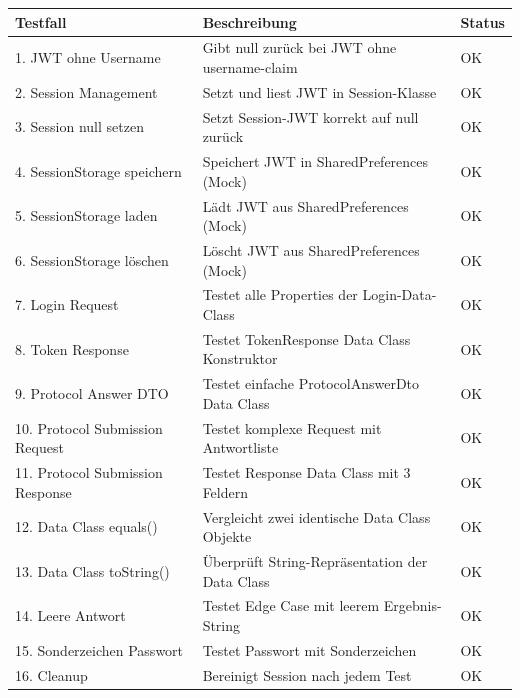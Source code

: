 \documentclass[a4paper,12pt]{article}
\begin{document}
\begin{tabularx}{\textwidth}{|l|X|l|}
\hline
\textbf{Testfall} & \textbf{ Beschreibung} & \textbf{Status} \\
\hline
1. JWT ohne Username & Gibt null zurück bei JWT ohne username-claim & OK \\
\hline
2. Session Management & Setzt und liest JWT in Session-Klasse & OK \\
\hline
3. Session null setzen & Setzt Session-JWT korrekt auf null zurück & OK \\
\hline
4. SessionStorage speichern & Speichert JWT in SharedPreferences (Mock) & OK \\
\hline
5. SessionStorage laden & Lädt JWT aus SharedPreferences (Mock) & OK \\
\hline
6. SessionStorage löschen & Löscht JWT aus SharedPreferences (Mock) & OK \\
\hline
7. Login Request & Testet alle Properties der Login-Data-Class & OK \\
\hline
8. Token Response & Testet TokenResponse Data Class Konstruktor & OK \\
\hline
9. Protocol Answer DTO & Testet einfache ProtocolAnswerDto Data Class & OK \\
\hline
10. Protocol Submission Request & Testet komplexe Request mit Antwortliste & OK \\
\hline
11. Protocol Submission Response & Testet Response Data Class mit 3 Feldern & OK \\
\hline
12. Data Class equals() & Vergleicht zwei identische Data Class Objekte & OK \\
\hline
13. Data Class toString() & Überprüft String-Repräsentation der Data Class & OK \\
\hline
14. Leere Antwort & Testet Edge Case mit leerem Ergebnis-String & OK \\
\hline
15. Sonderzeichen Passwort & Testet Passwort mit Sonderzeichen & OK \\
\hline
16. Cleanup & Bereinigt Session nach jedem Test & OK \\
\hline

\end{tabularx}
\end{document}
